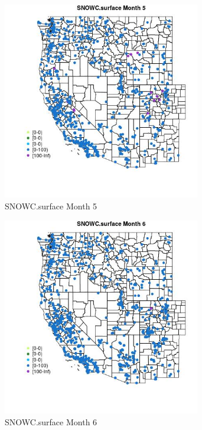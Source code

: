 \begin{figure} 
\centering  
\includegraphics[width=0.77\textwidth]{Code_Outputs/Report_ML_input_PM25_Step4_part_f_de_duplicated_aveswNAs_MapObsMo5SNOWCsurface.jpg} 
\caption{\label{fig:Report_ML_input_PM25_Step4_part_f_de_duplicated_aveswNAsMapObsMo5SNOWCsurface}SNOWC.surface Month 5} 
\end{figure} 
 

\begin{figure} 
\centering  
\includegraphics[width=0.77\textwidth]{Code_Outputs/Report_ML_input_PM25_Step4_part_f_de_duplicated_aveswNAs_MapObsMo6SNOWCsurface.jpg} 
\caption{\label{fig:Report_ML_input_PM25_Step4_part_f_de_duplicated_aveswNAsMapObsMo6SNOWCsurface}SNOWC.surface Month 6} 
\end{figure} 
 


